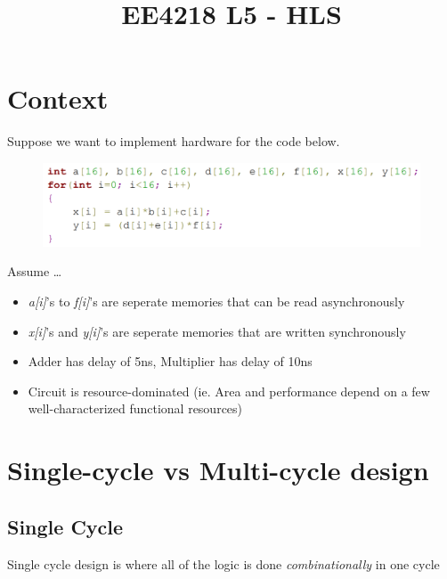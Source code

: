 \documentclass{article}
\title{\vspace{-2cm} EE4218 L5 - HLS}
\date{\vspace{-5ex}}
\begin{document}
\maketitle

\section{Context}
Suppose we want to implement hardware for the code below.
\begin{figure}[htp]
    \centering
    \includegraphics[width=12cm, scale=1]{S1/contextCode.PNG}
\end{figure}

Assume \dots
\begin{itemize}
    \item \textit{a[i]}'s to \textit{f[i]}'s are seperate memories that can be read asynchronously
    \item \textit{x[i]}'s and \textit{y[i]}'s are seperate memories that are written synchronously
    \item Adder has delay of 5ns, Multiplier has delay of 10ns
    \item Circuit is resource-dominated (ie. Area and performance depend on a few well-characterized functional resources)
\end{itemize}

\section{Single-cycle vs Multi-cycle design}
\subsection{Single Cycle}
Single cycle design is where all of the logic is done \textit{combinationally} in one cycle
\end{document}
